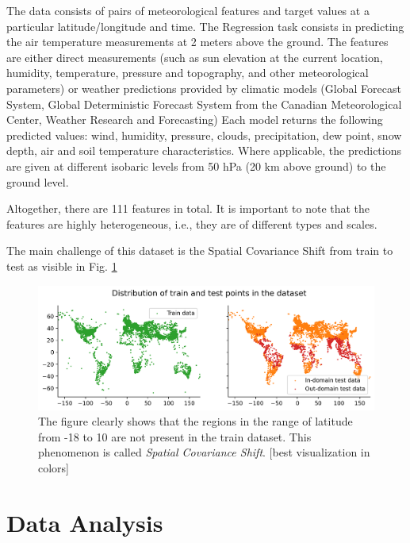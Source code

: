 \documentclass[letterpaper, 10 pt, conference]{ieeeconf}
\begin{document}
    The data consists of pairs of meteorological features and target values at a particular latitude/longitude and time. The Regression task consists in predicting the air temperature measurements at 2 meters above the ground.
    The features are either direct measurements (such as sun elevation at the current location, humidity, temperature, pressure and topography, and other meteorological parameters) or weather predictions provided by climatic models (Global Forecast System, Global Deterministic Forecast System from the Canadian Meteorological Center, Weather Research and Forecasting)
    Each model returns the following predicted values: wind, humidity, pressure, clouds, precipitation, dew point, snow depth, air and soil temperature characteristics. Where applicable, the predictions are given at different isobaric levels from 50 hPa (20 km above ground) to the ground level.

    Altogether, there are 111 features in total. It is important to note that the features are highly heterogeneous, i.e., they are of different types and scales.

    The main challenge of this dataset is the Spatial Covariance Shift from train to test as visible in Fig. \ref{fig:train-test-diff}

    \begin{figure}
        \centering
        \includegraphics[width=\linewidth]{assets/train-test-diff.png}
        \caption{The figure clearly shows that the regions in the range of latitude from -18 to 10 are not present in the train dataset. This phenomenon is called \textit{Spatial Covariance Shift}. [best visualization in colors] }
        \label{fig:train-test-diff}
    \end{figure}

    \section{Data Analysis}
    
\end{document}
